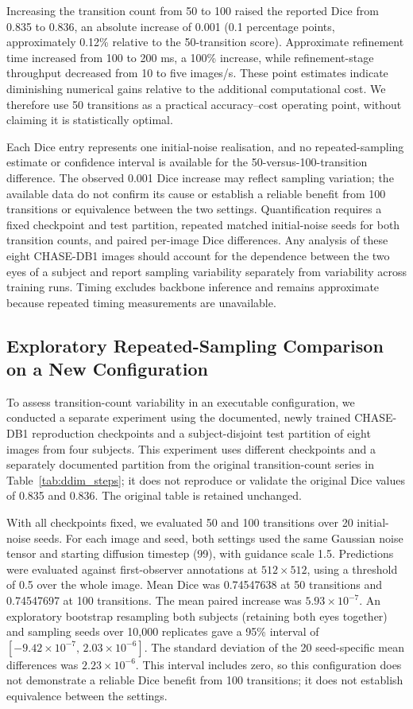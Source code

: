 \documentclass[jimaging,article,submit,pdftex,moreauthors]
  {Definitions/mdpi}
\begin{document}
Increasing the transition count from 50 to 100 raised the reported Dice from 0.835 to 0.836, an absolute increase of 0.001 (0.1 percentage points, approximately 0.12\% relative to the 50-transition score). Approximate refinement time increased from 100 to 200 ms, a 100\% increase, while refinement-stage throughput decreased from 10 to five images/s. These point estimates indicate diminishing numerical gains relative to the additional computational cost. We therefore use 50 transitions as a practical accuracy--cost operating point, without claiming it is statistically optimal.

Each Dice entry represents one initial-noise realisation, and no repeated-sampling estimate or confidence interval is available for the 50-versus-100-transition difference. The observed 0.001 Dice increase may reflect sampling variation; the available data do not confirm its cause or establish a reliable benefit from 100 transitions or equivalence between the two settings. Quantification requires a fixed checkpoint and test partition, repeated matched initial-noise seeds for both transition counts, and paired per-image Dice differences. Any analysis of these eight CHASE-DB1 images should account for the dependence between the two eyes of a subject and report sampling variability separately from variability across training runs. Timing excludes backbone inference and remains approximate because repeated timing measurements are unavailable.

\subsection{Exploratory Repeated-Sampling Comparison on a New Configuration}

To assess transition-count variability in an executable configuration, we conducted a separate experiment using the documented, newly trained CHASE-DB1 reproduction checkpoints and a subject-disjoint test partition of eight images from four subjects. This experiment uses different checkpoints and a separately documented partition from the original transition-count series in Table~\ref{tab:ddim_steps}; it does not reproduce or validate the original Dice values of 0.835 and 0.836. The original table is retained unchanged.

With all checkpoints fixed, we evaluated 50 and 100 transitions over 20 initial-noise seeds. For each image and seed, both settings used the same Gaussian noise tensor and starting diffusion timestep (99), with guidance scale 1.5. Predictions were evaluated against first-observer annotations at $512\times512$, using a threshold of 0.5 over the whole image. Mean Dice was 0.74547638 at 50 transitions and 0.74547697 at 100 transitions. The mean paired increase was $5.93\times10^{-7}$. An exploratory bootstrap resampling both subjects (retaining both eyes together) and sampling seeds over 10,000 replicates gave a 95\% interval of $[-9.42\times10^{-7},\,2.03\times10^{-6}]$. The standard deviation of the 20 seed-specific mean differences was $2.23\times10^{-6}$. This interval includes zero, so this configuration does not demonstrate a reliable Dice benefit from 100 transitions; it does not establish equivalence between the settings.
\end{document}
